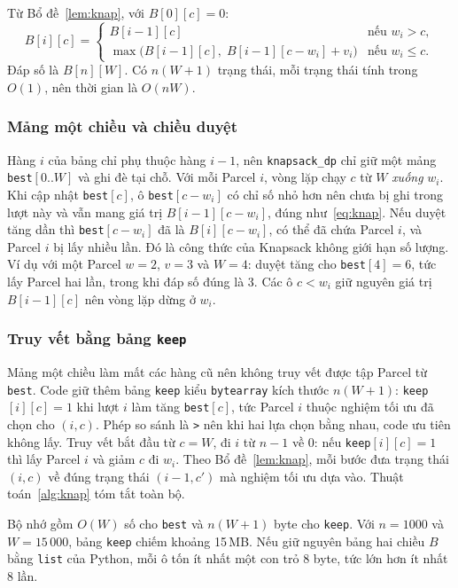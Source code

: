 Từ Bổ đề~\ref{lem:knap}, với $B[0][c] = 0$:
\begin{equation}\label{eq:knap}
B[i][c] =
\begin{cases}
B[i-1][c] & \text{nếu } w_i > c,\\
\max\bigl(B[i-1][c],\; B[i-1][c-w_i] + v_i\bigr) & \text{nếu } w_i \le c.
\end{cases}
\end{equation}
Đáp số là $B[n][W]$. Có $n(W+1)$ trạng thái, mỗi trạng thái tính trong $O(1)$, nên thời gian là $O(nW)$.

\subsubsection{Mảng một chiều và chiều duyệt}
Hàng $i$ của bảng chỉ phụ thuộc hàng $i-1$, nên \texttt{knapsack\_dp} chỉ giữ một mảng \texttt{best}$[0..W]$ và ghi đè tại chỗ. Với mỗi Parcel $i$, vòng lặp chạy $c$ từ $W$ \emph{xuống} $w_i$. Khi cập nhật \texttt{best}$[c]$, ô \texttt{best}$[c - w_i]$ có chỉ số nhỏ hơn nên chưa bị ghi trong lượt này và vẫn mang giá trị $B[i-1][c-w_i]$, đúng như~\eqref{eq:knap}. Nếu duyệt tăng dần thì \texttt{best}$[c - w_i]$ đã là $B[i][c-w_i]$, có thể đã chứa Parcel $i$, và Parcel $i$ bị lấy nhiều lần. Đó là công thức của Knapsack không giới hạn số lượng. Ví dụ với một Parcel $w = 2$, $v = 3$ và $W = 4$: duyệt tăng cho \texttt{best}$[4] = 6$, tức lấy Parcel hai lần, trong khi đáp số đúng là 3. Các ô $c < w_i$ giữ nguyên giá trị $B[i-1][c]$ nên vòng lặp dừng ở $w_i$.

\subsubsection{Truy vết bằng bảng \texttt{keep}}
Mảng một chiều làm mất các hàng cũ nên không truy vết được tập Parcel từ \texttt{best}. Code giữ thêm bảng \texttt{keep} kiểu \texttt{bytearray} kích thước $n(W+1)$: \texttt{keep}$[i][c] = 1$ khi lượt $i$ làm tăng \texttt{best}$[c]$, tức Parcel $i$ thuộc nghiệm tối ưu đã chọn cho $(i, c)$. Phép so sánh là \texttt{>} nên khi hai lựa chọn bằng nhau, code ưu tiên không lấy. Truy vết bắt đầu từ $c = W$, đi $i$ từ $n-1$ về $0$: nếu \texttt{keep}$[i][c] = 1$ thì lấy Parcel $i$ và giảm $c$ đi $w_i$. Theo Bổ đề~\ref{lem:knap}, mỗi bước đưa trạng thái $(i, c)$ về đúng trạng thái $(i-1, c')$ mà nghiệm tối ưu dựa vào. Thuật toán~\ref{alg:knap} tóm tắt toàn bộ.

Bộ nhớ gồm $O(W)$ số cho \texttt{best} và $n(W+1)$ byte cho \texttt{keep}. Với $n = 1000$ và $W = 15\,000$, bảng \texttt{keep} chiếm khoảng 15\,MB. Nếu giữ nguyên bảng hai chiều $B$ bằng \texttt{list} của Python, mỗi ô tốn ít nhất một con trỏ 8 byte, tức lớn hơn ít nhất 8 lần.

